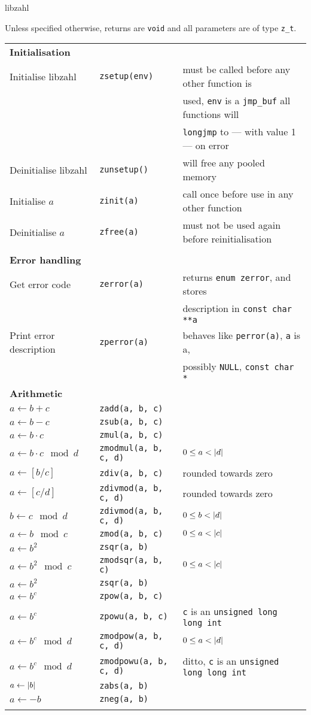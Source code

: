 \documentclass[10pt,draft]{article}
\DeclarePairedDelimiter\ab{\lvert}{\rvert}
\newcommand{\ullong}{{\tt unsigned long long int}}
\newcommand{\entry}[3]{ #2 & {\tt #1} & #3 \\ }
\newcommand{\entrycont}[1]{ & & \hspace*{2ex} #1 \\ }
\newcommand{\entryTwo}[4]{\entry{#1}{#2}{#3}\entrycont{#4}}
\newcommand{\entryThree}[5]{\entryTwo{#1}{#2}{#3}{#4}\entrycont{#5}}
\begin{document}
{\Huge libzahl}
\vspace{1ex}

Unless specified otherwise, returns are {\tt void} and all parameters are of type {\tt z\_t}.
\vspace{1.5em}



\hspace{-0.8em}
\begin{tabular}{lll}



\textbf{Initialisation} \\
\entryThree{zsetup(env)} {Initialise libzahl}   {must be called before any other function is}
                                                {used, {\tt env} is a {\tt jmp\_buf} all functions will}
                                                {{\tt longjmp} to --- with value 1 --- on error}
\entry     {zunsetup()}  {Deinitialise libzahl} {will free any pooled memory}
\entry     {zinit(a)}    {Initialise $a$}       {call once before use in any other function}
\entry     {zfree(a)}    {Deinitialise $a$}     {must not be used again before reinitialisation}
\\

\textbf{Error handling} \\
\entryTwo{zerror(a)}  {Get error code}          {returns {\tt enum zerror}, and stores}
                                                {description in {\tt const char **a}}
\entryTwo{zperror(a)} {Print error description} {behaves like {\tt perror(a)}, {\tt a} is a,}
                                                {possibly {\tt NULL}, {\tt const char *}}

\textbf{Arithmetic} \\
\entry{zadd(a, b, c)}        {$a \gets b + c$}            {}
\entry{zsub(a, b, c)}        {$a \gets b - c$}            {}
\entry{zmul(a, b, c)}        {$a \gets b \cdot c$}        {}
\entry{zmodmul(a, b, c, d)}  {$a \gets b \cdot c \mod d$} {$0 \le a < \ab{d}$}
\entry{zdiv(a, b, c)}        {$a \gets [b / c]$}          {rounded towards zero}
\entry{zdivmod(a, b, c, d)}  {$a \gets [c / d]$}          {rounded towards zero}
\entry{zdivmod(a, b, c, d)}  {$b \gets c \mod d$}         {$0 \le b < \ab{d}$}
\entry{zmod(a, b, c)}        {$a \gets b \mod c$}         {$0 \le a < \ab{c}$}
\entry{zsqr(a, b)}           {$a \gets b^2$}              {}
\entry{zmodsqr(a, b, c)}     {$a \gets b^2 \mod c$}       {$0 \le a < \ab{c}$}
\entry{zsqr(a, b)}           {$a \gets b^2$}              {}
\entry{zpow(a, b, c)}        {$a \gets b^c$}              {}
\entry{zpowu(a, b, c)}       {$a \gets b^c$}              {{\tt c} is an \ullong{}}
\entry{zmodpow(a, b, c, d)}  {$a \gets b^c \mod d$}       {$0 \le a < \ab{d}$}
\entry{zmodpowu(a, b, c, d)} {$a \gets b^c \mod d$}       {ditto, {\tt c} is an \ullong{}}
\entry{zabs(a, b)}           {$a \gets \ab{b}$}           {}
\entry{zneg(a, b)}           {$a \gets -b$}               {}
\\


\end{tabular}
\end{document}
